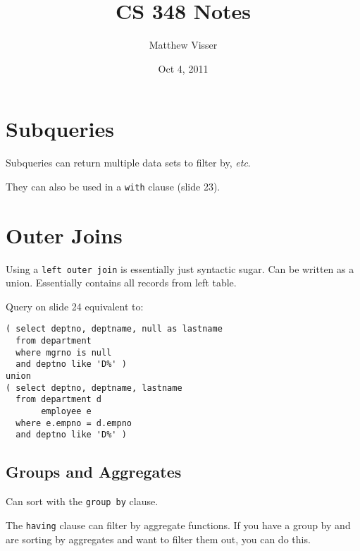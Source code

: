 \documentclass[12pt]{article}
\begin{document}
\title{CS 348 Notes}
\author{Matthew Visser}
\date{Oct  4, 2011}
\maketitle

\section{Subqueries}

Subqueries can return multiple data sets to filter by, \textit{etc}.

They can also be used in a \texttt{with} clause (slide 23).

\section{Outer Joins}

Using a \texttt{left outer join} is essentially just syntactic sugar. Can be
written as a union. Essentially contains all records from left table.

Query on slide 24 equivalent to:
\begin{verbatim}
( select deptno, deptname, null as lastname
  from department
  where mgrno is null
  and deptno like 'D%' )
union
( select deptno, deptname, lastname
  from department d
       employee e
  where e.empno = d.empno
  and deptno like 'D%' )
\end{verbatim}

\subsection{Groups and Aggregates}

Can sort with the \texttt{group by} clause.

The \texttt{having} clause can filter by aggregate functions.  If you have a
group by and are sorting by aggregates and want to filter them out, you can do
this.
\end{document}
